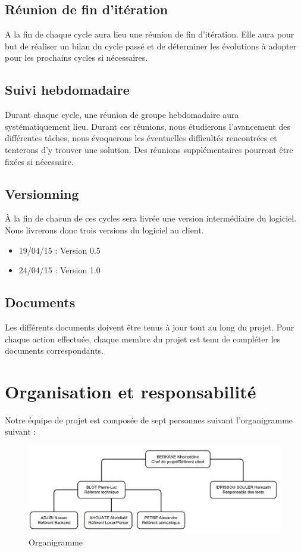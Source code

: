 \documentclass{../res/univ-projet}
\begin{document}
  \subsection{Réunion de fin d’itération}
    A la fin de chaque cycle aura lieu une réunion de fin d’itération. Elle aura pour but de réaliser un bilan du cycle passé et de déterminer les évolutions à adopter pour les prochains cycles si nécessaires.
  \subsection{Suivi hebdomadaire}
    Durant chaque cycle, une réunion de groupe hebdomadaire aura systématiquement lieu. Durant ces réunions, nous étudierons l’avancement des différentes tâches, nous évoquerons les éventuelles difficultés rencontrées et tenterons d’y trouver une solution. Des réunions supplémentaires pourront être fixées si nécessaire.
  \subsection{Versionning}
    À la fin de chacun de ces cycles sera livrée une version intermédiaire du logiciel. Nous livrerons donc trois versions du logiciel au client.
    \begin{itemize}
      \item 19/04/15 : Version 0.5
      \item 24/04/15 : Version 1.0
    \end{itemize}
  \subsection{Documents}
    Les différents documents doivent être tenus à jour tout au long du projet. Pour chaque action effectuée, chaque membre du projet est tenu de compléter les documents correspondants.
  \newpage
\section{Organisation et responsabilité}
Notre équipe de projet est composée de sept personnes suivant l’organigramme suivant :
 \begin{figure}[!h]
    \includegraphics[width=17.8cm]{fig/organigramme-v2.png}
    \caption{Organigramme}
    \label{organigramme}
  \end{figure}
\end{document}
